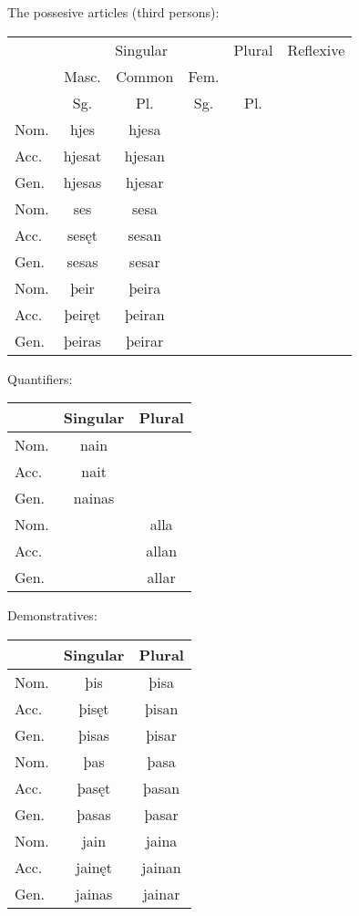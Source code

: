 The possesive articles (third persons):

\begin{center}
\begin{tabular}{l|ccccc}
& \multicolumn{3}{c}{Singular} & Plural & Reflexive \\
& Masc. & Common & Fem. \\
& Sg. & Pl. & Sg. & Pl. \\
\hline
Nom. & hjes   & hjesa  \\
Acc. & hjesat & hjesan \\
Gen. & hjesas & hjesar \\
\hline
Nom. & ses   & sesa  \\
Acc. & sesęt & sesan \\
Gen.   & sesas & sesar \\
\hline
Nom. & þeir   & þeira  \\
Acc. & þeiręt & þeiran \\
Gen.   & þeiras & þeirar \\
\end{tabular}
\end{center}

Quantifiers:

\begin{center}
\begin{tabular}{l|cc}
& Singular & Plural \\
\hline
Nom. & nain &  \\
Acc. & nait &  \\
Gen.   & nainas &  \\
\hline
Nom. & & alla  \\
Acc. & & allan \\
Gen.   & & allar \\
\end{tabular}
\end{center}

Demonstratives:

\begin{center}
\begin{tabular}{l|cc}
& Singular & Plural \\
\hline
Nom. & þis   & þisa  \\
Acc. & þisęt & þisan \\
Gen.   & þisas & þisar \\
\hline
Nom. & þas   & þasa  \\
Acc. & þasęt & þasan \\
Gen.   & þasas & þasar \\
\hline
Nom. & jain   & jaina  \\
Acc. & jainęt & jainan \\
Gen.   & jainas & jainar \\
\end{tabular}
\end{center}

